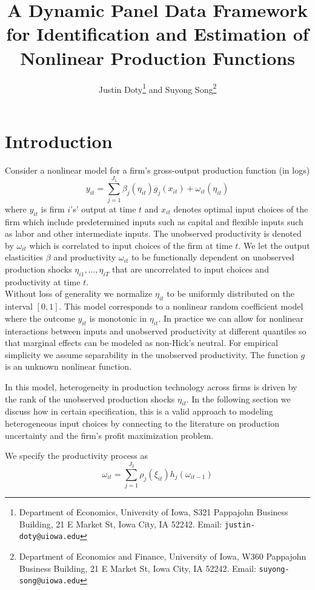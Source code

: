 \documentclass{article}
\title{A Dynamic Panel Data Framework for Identification and Estimation of Nonlinear Production Functions}
\author{Justin Doty\thanks{Department of Economics, University of Iowa, S321 Pappajohn Business Building, 21 E Market St, Iowa City, IA 52242. Email: \texttt{justin-doty@uiowa.edu}} and Suyong Song\thanks{Department of Economics and Finance, University of Iowa, W360 Pappajohn Business Building, 21 E Market St, Iowa City, IA 52242. Email: \texttt{suyong-song@uiowa.edu}}
}
\date{\vspace{-5ex}}
\begin{document}
\maketitle{} 
\section{Introduction}

Consider a nonlinear model for a firm's gross-output production function (in logs)
\begin{equation}\label{modely}
y_{it}=\sum_{j=1}^{J_{1}}\beta_{j}(\eta_{it})g_{j}(x_{it})+\omega_{it}(\eta_{it})
\end{equation}
where $y_{it}$ is firm $i$'s' output at time $t$ and $x_{it}$ denotes optimal input choices of the firm which include predetermined inputs such as capital and flexible inputs such as labor and other intermediate inputs. The unobserved productivity is denoted by $\omega_{it}$ which is correlated to input choices of the firm at time $t$. We let the output elasticities $\beta$ and productivity $\omega_{it}$ to be functionally dependent on unobserved production shocks $\eta_{i1},\dots, \eta_{iT}$ that are uncorrelated to input choices and productivity at time $t$.\\

Without loss of generality we normalize $\eta_{it}$ to be uniformly distributed on the interval $[0,1]$. This model corresponds to a nonlinear random coefficient model where the outcome $y_{it}$ is monotonic in $\eta_{it}$. In practice we can allow for nonlinear interactions between inputs and unobserved productivity at different quantiles so that marginal effects can be modeled as non-Hick's neutral. For empirical simplicity we assume separability in the unobserved productivity. The function $g$ is an unknown nonlinear function.

In this model, heterogeneity in production technology across firms is driven by the rank of the unobserved production shocks $\eta_{it}$. In the following section we discuss how in certain specification, this is a valid approach to modeling heterogeneous input choices by connecting to the literature on production uncertainty and the firm's profit maximization problem.

We specify the productivity process as
\begin{equation}\label{modelw}
\omega_{it}=\sum_{j=1}^{J_{2}}\rho_{j}(\xi_{it})h_{j}(\omega_{it-1})
\end{equation}
\end{document}
